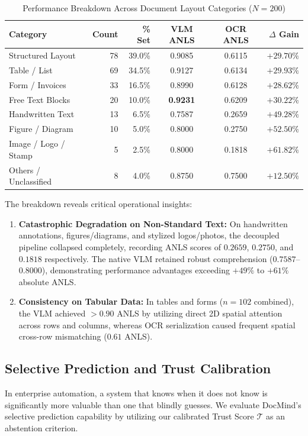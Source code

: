 \documentclass[conference]{IEEEtran}
\begin{document}
{\begin{table}[htbp]
\caption{Performance Breakdown Across Document Layout Categories ($N = 200$)}
\label{tab:categories}
\begin{center}
\begin{tabular}{lrrccr}
\toprule
\textbf{Category} & \textbf{Count} & \textbf{\% Set} & \textbf{VLM ANLS} & \textbf{OCR ANLS} & \textbf{$\Delta$ Gain} \\
\midrule
Structured Layout & 78 & 39.0\% & 0.9085 & 0.6115 & $+29.70\%$ \\
Table / List & 69 & 34.5\% & 0.9127 & 0.6134 & $+29.93\%$ \\
Form / Invoices & 33 & 16.5\% & 0.8990 & 0.6128 & $+28.62\%$ \\
Free Text Blocks & 20 & 10.0\% & \textbf{0.9231} & 0.6209 & $+30.22\%$ \\
Handwritten Text & 13 & 6.5\% & 0.7587 & 0.2659 & $\mathbf{+49.28\%}$ \\
Figure / Diagram & 10 & 5.0\% & 0.8000 & 0.2750 & $\mathbf{+52.50\%}$ \\
Image / Logo / Stamp & 5 & 2.5\% & 0.8000 & 0.1818 & $\mathbf{+61.82\%}$ \\
Others / Unclassified & 8 & 4.0\% & 0.8750 & 0.7500 & $+12.50\%$ \\
\bottomrule
\end{tabular}
\end{center}
\end{table}

The breakdown reveals critical operational insights:
\begin{enumerate}
    \item \textbf{Catastrophic Degradation on Non-Standard Text:} On handwritten annotations, figures/diagrams, and stylized logos/photos, the decoupled pipeline collapsed completely, recording ANLS scores of $0.2659$, $0.2750$, and $0.1818$ respectively. The native VLM retained robust comprehension ($0.7587$--$0.8000$), demonstrating performance advantages exceeding $+49\%$ to $+61\%$ absolute ANLS.
    \item \textbf{Consistency on Tabular Data:} In tables and forms ($n = 102$ combined), the VLM achieved $>0.90$ ANLS by utilizing direct 2D spatial attention across rows and columns, whereas OCR serialization caused frequent spatial cross-row mismatching ($0.61$ ANLS).
\end{enumerate}

\subsection{Selective Prediction and Trust Calibration}
In enterprise automation, a system that knows when it does not know is significantly more valuable than one that blindly guesses. We evaluate DocMind's selective prediction capability by utilizing our calibrated Trust Score $\mathcal{T}$ as an abstention criterion.

}
\end{document}
